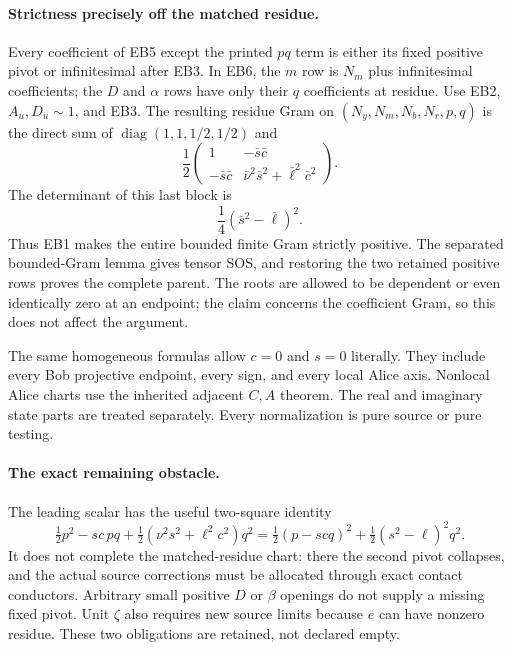 \paragraph{Strictness precisely off the matched residue.}
Every coefficient of EB5 except the printed $pq$ term is either
its fixed positive pivot or infinitesimal after EB3. In EB6, the
$m$ row is $N_m$ plus infinitesimal coefficients; the $D$ and
$\alpha$ rows have only their $q$ coefficients at residue.
Use EB2, $A_u,D_u\sim1$, and EB3. The resulting residue Gram on
$(N_y,N_m,N_b,N_r,p,q)$ is the direct sum of
$\operatorname{diag}(1,1,1/2,1/2)$ and
\[
 \frac12
 \begin{pmatrix}
 1&-\bar s\bar c\\
 -\bar s\bar c&\bar\nu^2\bar s^2+\bar\ell^2\bar c^2
 \end{pmatrix}.                                                \tag{EB8}
\]
The determinant of this last block is
\[
             \frac14(\bar s^2-\bar\ell)^2.                    \tag{EB9}
\]
Thus EB1 makes the entire bounded finite Gram strictly positive.
The separated bounded-Gram lemma gives tensor SOS, and restoring the
two retained positive rows proves the complete parent. The roots are
allowed to be dependent or even identically zero at an endpoint; the
claim concerns the coefficient Gram, so this does not affect the
argument.

The same homogeneous formulas allow $c=0$ and $s=0$ literally.
They include every Bob projective endpoint, every sign, and every
local Alice axis. Nonlocal Alice charts use the inherited adjacent
$C,A$ theorem. The real and imaginary state parts are treated
separately. Every normalization is pure source or pure testing.

\paragraph{The exact remaining obstacle.}
The leading scalar has the useful two-square identity
\[
 \tfrac12p^2-sc\,pq
 +\tfrac12(\nu^2s^2+\ell^2c^2)q^2
 =\tfrac12(p-scq)^2+\tfrac12(s^2-\ell)^2q^2.                  \tag{EB10}
\]
It does not complete the matched-residue chart: there the second
pivot collapses, and the actual source corrections must be allocated
through exact contact conductors. Arbitrary small positive $D$ or
$\beta$ openings do not supply a missing fixed pivot. Unit $\zeta$
also requires new source limits because $e$ can have nonzero residue.
These two obligations are retained, not declared empty.

